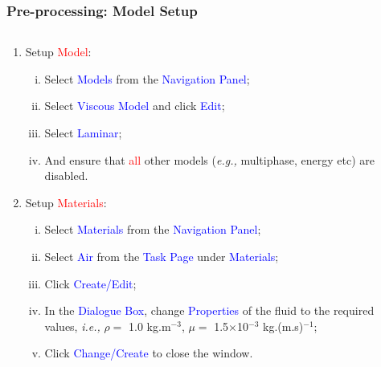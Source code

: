 \documentclass[10pt,compress, unknownkeysallowed]{beamer}
\newcommand{\red}{\textcolor{red}}
\newcommand{\blue}{\textcolor{blue}}
\newcommand{\eg}{{\it e.g., }}
\newcommand{\ie}{{\it i.e., }}
\begin{document}
\begin{frame}
  \frametitle{Pre-processing: Model Setup}
    \begin{columns}
        \begin{column}[l]{0.5\linewidth}
           \begin{enumerate}\scriptsize\setcounter{enumi}{6}
                \item<1-> Setup \red{Model}:
                    \begin{enumerate}[i)]\scriptsize
                       \item<1-> Select \blue{Models} from the \blue{Navigation Panel};
                       \item<1-> Select \blue{Viscous Model} and click \blue{Edit};
                       \item<1-> Select \blue{Laminar};
                       \item<1-> And ensure that \red{all} other models (\eg multiphase, energy etc) are disabled.                      
                   \end{enumerate}
                \item<2-> Setup \red{Materials}:
                    \begin{enumerate}[i)]\scriptsize
                       \item<2-> Select \blue{Materials} from the \blue{Navigation Panel};
                       \item<2-> Select \blue{Air} from the \blue{Task Page} under \blue{Materials};
                       \item<2-> Click \blue{Create/Edit};
                       \item<2-> In the \blue{Dialogue Box}, change \blue{Properties} of the fluid to the required values, \ie $\rho=$ 1.0 kg.m$^{-3}$, $\mu=$ 1.5$\times$10$^{-3}$ kg.(m.s)$^{-1}$;     
                       \item<2-> Click \blue{Change/Create} to close the window.                
                   \end{enumerate}                   
           \end{enumerate}
        \end{column}
           \begin{column}[l]{0.5\linewidth}
\end{column}
\end{columns}
\end{frame}
\end{document}
